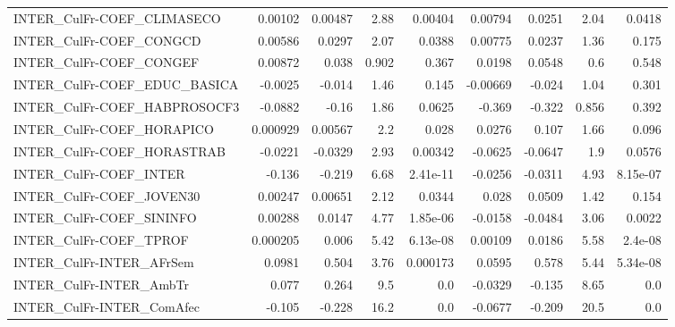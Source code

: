 \begin{tabular}{lrrrrrrrr}
INTER\_CulFr-COEF\_CLIMASECO             &     0.00102 &      0.00487 &     2.88 &  0.00404 &    0.00794 &      0.0251 &         2.04 &        0.0418 \\
INTER\_CulFr-COEF\_CONGCD                &     0.00586 &       0.0297 &     2.07 &   0.0388 &    0.00775 &      0.0237 &         1.36 &         0.175 \\
INTER\_CulFr-COEF\_CONGEF                &     0.00872 &        0.038 &    0.902 &    0.367 &     0.0198 &      0.0548 &          0.6 &         0.548 \\
INTER\_CulFr-COEF\_EDUC\_BASICA           &     -0.0025 &       -0.014 &     1.46 &    0.145 &   -0.00669 &      -0.024 &         1.04 &         0.301 \\
INTER\_CulFr-COEF\_HABPROSOCF3           &     -0.0882 &        -0.16 &     1.86 &   0.0625 &     -0.369 &      -0.322 &        0.856 &         0.392 \\
INTER\_CulFr-COEF\_HORAPICO              &    0.000929 &      0.00567 &      2.2 &    0.028 &     0.0276 &       0.107 &         1.66 &         0.096 \\
INTER\_CulFr-COEF\_HORASTRAB             &     -0.0221 &      -0.0329 &     2.93 &  0.00342 &    -0.0625 &     -0.0647 &          1.9 &        0.0576 \\
INTER\_CulFr-COEF\_INTER                 &      -0.136 &       -0.219 &     6.68 & 2.41e-11 &    -0.0256 &     -0.0311 &         4.93 &      8.15e-07 \\
INTER\_CulFr-COEF\_JOVEN30               &     0.00247 &      0.00651 &     2.12 &   0.0344 &      0.028 &      0.0509 &         1.42 &         0.154 \\
INTER\_CulFr-COEF\_SININFO               &     0.00288 &       0.0147 &     4.77 & 1.85e-06 &    -0.0158 &     -0.0484 &         3.06 &        0.0022 \\
INTER\_CulFr-COEF\_TPROF                 &    0.000205 &        0.006 &     5.42 & 6.13e-08 &    0.00109 &      0.0186 &         5.58 &       2.4e-08 \\
INTER\_CulFr-INTER\_AFrSem               &      0.0981 &        0.504 &     3.76 & 0.000173 &     0.0595 &       0.578 &         5.44 &      5.34e-08 \\
INTER\_CulFr-INTER\_AmbTr                &       0.077 &        0.264 &      9.5 &      0.0 &    -0.0329 &      -0.135 &         8.65 &           0.0 \\
INTER\_CulFr-INTER\_ComAfec              &      -0.105 &       -0.228 &     16.2 &      0.0 &    -0.0677 &      -0.209 &         20.5 &           0.0 \\

\end{tabular}
